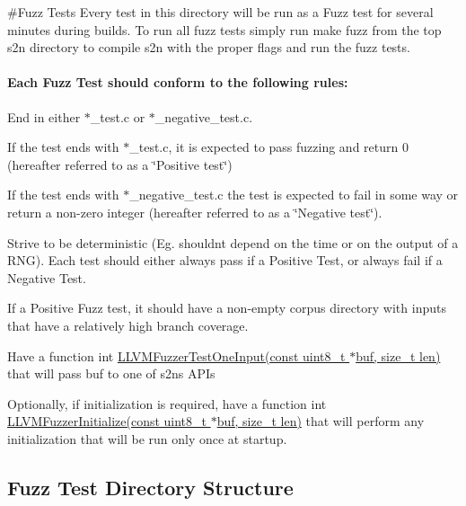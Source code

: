 \#\+Fuzz Tests Every test in this directory will be run as a Fuzz test for several minutes during builds. To run all fuzz tests simply run {\ttfamily make fuzz} from the top {\ttfamily s2n} directory to compile s2n with the proper flags and run the fuzz tests.

\paragraph*{Each Fuzz Test should conform to the following rules\+:}


\begin{DoxyEnumerate}
\item End in either {\ttfamily $\ast$\+\_\+test.c} or {\ttfamily $\ast$\+\_\+negative\+\_\+test.c}.
\begin{DoxyEnumerate}
\item If the test ends with {\ttfamily $\ast$\+\_\+test.c}, it is expected to pass fuzzing and return 0 (hereafter referred to as a \char`\"{}\+Positive test\char`\"{})
\item If the test ends with {\ttfamily $\ast$\+\_\+negative\+\_\+test.c} the test is expected to fail in some way or return a non-\/zero integer (hereafter referred to as a \char`\"{}\+Negative test\char`\"{}).
\end{DoxyEnumerate}
\item Strive to be deterministic (Eg. shouldn\textquotesingle{}t depend on the time or on the output of a R\+NG). Each test should either always pass if a Positive Test, or always fail if a Negative Test.
\item If a Positive Fuzz test, it should have a non-\/empty corpus directory with inputs that have a relatively high branch coverage.
\item Have a function {\ttfamily int \hyperlink{s2n__server__fuzz__test_8c_aea409319c7706f2cf28137757e2c36d4}{L\+L\+V\+M\+Fuzzer\+Test\+One\+Input(const uint8\+\_\+t $\ast$buf, size\+\_\+t len)}} that will pass {\ttfamily buf} to one of s2n\textquotesingle{}s A\+PI\textquotesingle{}s
\item Optionally, if initialization is required, have a function {\ttfamily int \hyperlink{s2n__server__fuzz__test_8c_ab4d51e660cd18e9b881a804ba252d9d7}{L\+L\+V\+M\+Fuzzer\+Initialize(const uint8\+\_\+t $\ast$buf, size\+\_\+t len)}} that will perform any initialization that will be run only once at startup.
\end{DoxyEnumerate}

\subsection*{Fuzz Test Directory Structure}

